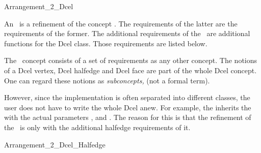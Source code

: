 
\ccRefPageBegin


\begin{ccRefConcept}{Arrangement_2_Dcel}

\ccDefinition
    An \ccRefName\ is a refinement of the  concept 
    . 
    The requirements of the latter are 
    the requirements of the former.
    The additional requirements of the \ccRefName\ are
    additional functions for the
    Dcel  class. Those requirements are listed below.

\ccHasModels

   The \ccRefName\ concept consists of a set of requirements as any other 
   concept. The notions of a Dcel vertex, Dcel halfedge and Dcel face are
   part of the whole Dcel concept. One can regard these notions as 
   {\em subconcepts,} (not a formal term). 

   However, since the implementation is often separated into different 
   classes, the user does not have to write the whole Dcel anew. For example,
   the  inherits the 
    with the actual parameters
   ,  and 
   . The reason for this is that the refinement of 
   the \ccRefName\ is only with the additional halfedge requirements of it.


\begin{ccClass}{Arrangement_2_Dcel_Halfedge}


\end{ccClass}
\end{ccRefConcept}
